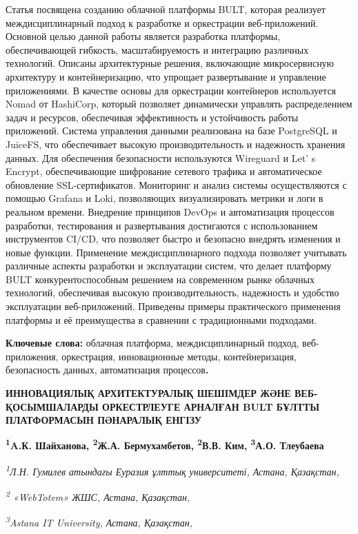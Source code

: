 {Статья посвящена созданию облачной платформы BULT, которая реализует
междисциплинарный подход к разработке и оркестрации веб-приложений.
Основной целью данной работы является разработка платформы,
обеспечивающей гибкость, масштабируемость и интеграцию различных
технологий. Описаны архитектурные решения, включающие микросервисную
архитектуру и контейнеризацию, что упрощает развертывание и управление
приложениями. В качестве основы для оркестрации контейнеров используется
Nomad от HashiCorp, который позволяет динамически управлять
распределением задач и ресурсов, обеспечивая эффективность и
устойчивость работы приложений. Система управления данными реализована
на базе PostgreSQL и JuiceFS, что обеспечивает высокую
производительность и надежность хранения данных. Для обеспечения
безопасности используются Wireguard и Let' s Encrypt,
обеспечивающие шифрование сетевого трафика и автоматическое обновление
SSL-сертификатов. Мониторинг и анализ системы осуществляются с помощью
Grafana и Loki, позволяющих визуализировать метрики и логи в реальном
времени. Внедрение принципов DevOps и автоматизация процессов
разработки, тестирования и развертывания достигаются с использованием
инструментов CI/CD, что позволяет быстро и безопасно внедрять изменения
и новые функции. Применение междисциплинарного подхода позволяет
учитывать различные аспекты разработки и эксплуатации систем, что делает
платформу BULT конкурентоспособным решением на современном рынке
облачных технологий, обеспечивая высокую производительность, надежность
и удобство эксплуатации веб-приложений. Приведены примеры практического
применения платформы и её преимущества в сравнении с традиционными
подходами.

{\bfseries Ключевые слова:} облачная платформа, междисциплинарный подход,
веб-приложения, оркестрация, инновационные методы, контейнеризация,
безопасность данных, автоматизация процессов{\bfseries .}

{\bfseries ИННОВАЦИЯЛЫҚ АРХИТЕКТУРАЛЫҚ ШЕШІМДЕР ЖӘНЕ ВЕБ-ҚОСЫМШАЛАРДЫ
ОРКЕСТРЛЕУГЕ АРНАЛҒАН BULT БҰЛТТЫ ПЛАТФОРМАСЫН ПӘНАРАЛЫҚ ЕНГІЗУ}

{\bfseries \textsuperscript{1}A.К. Шайханова, \textsuperscript{2}Ж.А.
Бермухамбетов, \textsuperscript{2}В.В. Ким, \textsuperscript{3}А.О.
Тлеубаева\textsuperscript{\envelope }}

\emph{\textsuperscript{1}Л.Н. Гумилев атындағы Еуразия ұлттық
университеті, Астана, Қазақстан,}

\emph{\textsuperscript{2} «WebTotem» ЖШС, Астана, Қазақстан,}

\emph{\textsuperscript{3}Astana IT University, Астана, Қазақстан,}

}
